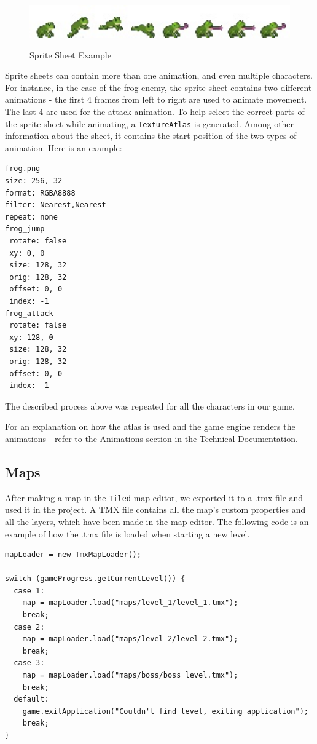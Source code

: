 \documentclass[12p]{article}
\begin{document}
\begin{figure}[ht]
  \center
  \includegraphics[width=1\textwidth]{Documentation/frog.jpg}
  \label{SpriteSheetExample}
  \caption{Sprite Sheet Example}
\end{figure}

Sprite sheets can contain more than one animation, and even multiple characters. For instance, in the case of the frog enemy, the sprite sheet contains two different animations - the first 4 frames from left to right are used to animate movement. The last 4 are used for the attack animation. To help select the correct parts of the sprite sheet while animating, a \texttt{TextureAtlas} is generated. Among other information about the sheet, it contains the start position of the two types of animation. Here is an example:

\begin{verbatim}
frog.png
size: 256, 32
format: RGBA8888
filter: Nearest,Nearest
repeat: none
frog_jump
 rotate: false
 xy: 0, 0
 size: 128, 32
 orig: 128, 32
 offset: 0, 0
 index: -1
frog_attack
 rotate: false
 xy: 128, 0
 size: 128, 32
 orig: 128, 32
 offset: 0, 0
 index: -1
\end{verbatim}

The described process above was repeated for all the characters in our game. 

For an explanation on how the atlas is used and the game engine renders the animations - refer to the Animations section in the Technical Documentation.


\newpage
\subsection{Maps} \label{DocMaps}

After making a map in the \texttt{Tiled} map editor, we exported it to a .tmx file and used it in the project. A TMX file contains all the map’s custom properties and all the layers, which have been made in the map editor. The following code is an example of how the .tmx file is loaded when starting a new level.

\begin{verbatim}
mapLoader = new TmxMapLoader();

switch (gameProgress.getCurrentLevel()) {
  case 1:
    map = mapLoader.load("maps/level_1/level_1.tmx");
    break;
  case 2:
    map = mapLoader.load("maps/level_2/level_2.tmx");
    break;
  case 3:
    map = mapLoader.load("maps/boss/boss_level.tmx");
    break;
  default:
    game.exitApplication("Couldn't find level, exiting application");
    break;
}
\end{verbatim}
\end{document}
